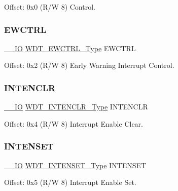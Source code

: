 Offset\+: 0x0 (R/W 8) Control. 

\mbox{\label{struct_wdt_a96a0bb45f2388fc6947af86c7aebce25}} 
\subsubsection{\texorpdfstring{EWCTRL}{EWCTRL}}
{\footnotesize\ttfamily \mbox{\hyperlink{core__cm0plus_8h_aec43007d9998a0a0e01faede4133d6be}{\+\_\+\+\_\+\+IO}} \mbox{\hyperlink{union_w_d_t___e_w_c_t_r_l___type}{W\+D\+T\+\_\+\+E\+W\+C\+T\+R\+L\+\_\+\+Type}} E\+W\+C\+T\+RL}



Offset\+: 0x2 (R/W 8) Early Warning Interrupt Control. 

\mbox{\label{struct_wdt_a20a8733afbfa125c5b04dad935b603b5}} 
\subsubsection{\texorpdfstring{INTENCLR}{INTENCLR}}
{\footnotesize\ttfamily \mbox{\hyperlink{core__cm0plus_8h_aec43007d9998a0a0e01faede4133d6be}{\+\_\+\+\_\+\+IO}} \mbox{\hyperlink{union_w_d_t___i_n_t_e_n_c_l_r___type}{W\+D\+T\+\_\+\+I\+N\+T\+E\+N\+C\+L\+R\+\_\+\+Type}} I\+N\+T\+E\+N\+C\+LR}



Offset\+: 0x4 (R/W 8) Interrupt Enable Clear. 

\mbox{\label{struct_wdt_aabffd6be6854e3018e819d5848f109f2}} 
\subsubsection{\texorpdfstring{INTENSET}{INTENSET}}
{\footnotesize\ttfamily \mbox{\hyperlink{core__cm0plus_8h_aec43007d9998a0a0e01faede4133d6be}{\+\_\+\+\_\+\+IO}} \mbox{\hyperlink{union_w_d_t___i_n_t_e_n_s_e_t___type}{W\+D\+T\+\_\+\+I\+N\+T\+E\+N\+S\+E\+T\+\_\+\+Type}} I\+N\+T\+E\+N\+S\+ET}



Offset\+: 0x5 (R/W 8) Interrupt Enable Set. 

\mbox{\label{struct_wdt_a535f9dc206f52a85eff66121e803c6db}} 
